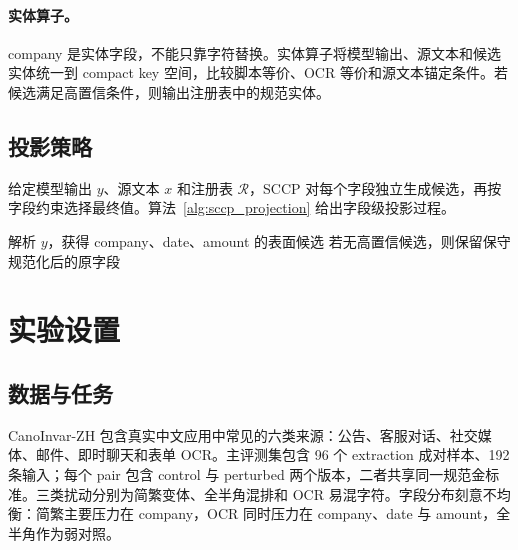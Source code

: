 ﻿\documentclass[UTF8,11pt,a4paper]{ctexart}
\newcommand{\method}{SCCP}
\newcommand{\dataset}{CanoInvar-ZH}
\begin{document}
\paragraph{实体算子。}
company 是实体字段，不能只靠字符替换。实体算子将模型输出、源文本和候选实体统一到 compact key 空间，比较脚本等价、OCR 等价和源文本锚定条件。若候选满足高置信条件，则输出注册表中的规范实体。

\subsection{投影策略}

给定模型输出 $y$、源文本 $x$ 和注册表 $\mathcal{R}$，\method{} 对每个字段独立生成候选，再按字段约束选择最终值。算法~\ref{alg:sccp_projection} 给出字段级投影过程。

\begin{algorithm}[H]
\small
\caption{\method{} 的字段级规范投影过程}
\label{alg:sccp_projection}
解析 $y$，获得 company、date、amount 的表面候选\;
若无高置信候选，则保留保守规范化后的原字段\;
\;
\end{algorithm}

\section{实验设置}

\subsection{数据与任务}

\dataset{} 包含真实中文应用中常见的六类来源：公告、客服对话、社交媒体、邮件、即时聊天和表单 OCR。主评测集包含 96 个 extraction 成对样本、192 条输入；每个 pair 包含 control 与 perturbed 两个版本，二者共享同一规范金标准。三类扰动分别为简繁变体、全半角混排和 OCR 易混字符。字段分布刻意不均衡：简繁主要压力在 company，OCR 同时压力在 company、date 与 amount，全半角作为弱对照。
\end{document}
